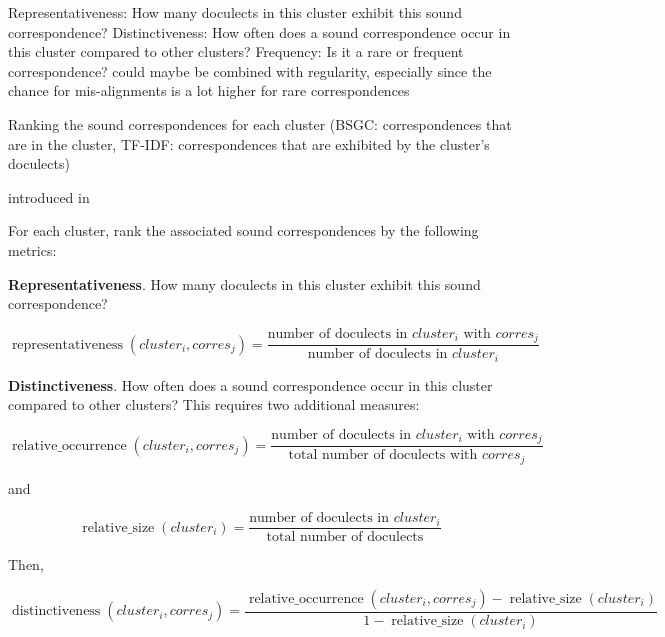 \documentclass[a4paper]{article}
\begin{document}
Representativeness: How many doculects in this cluster exhibit this sound correspondence? \citep{wieling2011bipartite}
Distinctiveness: How often does a sound correspondence occur in this cluster compared to other clusters? \citep{wieling2011bipartite}
Frequency: Is it a rare or frequent correspondence? could maybe be combined with regularity, especially since the chance for mis-alignments is a lot higher for rare correspondences

Ranking the sound correspondences for each cluster
(BSGC: correspondences that are in the cluster,
TF-IDF: correspondences that are exhibited by the cluster's doculects)

introduced in \citet{wieling2011bipartite}

For each cluster, rank the associated sound correspondences by the following metrics:

\textbf{Representativeness}.
How many doculects in this cluster exhibit this sound correspondence?

\begin{equation*}
\operatorname{representativeness}(cluster_i, corres_j) = 
\frac{\text{number of doculects in } cluster_i \text{ with }  corres_j}
{\text{number of doculects in }  cluster_i}
\end{equation*}

\textbf{Distinctiveness}.
How often does a sound correspondence occur in this cluster compared to other clusters? 
This requires two additional measures: 

\begin{equation*}
\operatorname{relative\_occurrence}(cluster_i, corres_j) = 
\frac{\text{number of doculects in } cluster_i \text{ with }  corres_j}
{\text{total number of doculects with } corres_j}
\end{equation*}

and

\begin{equation*}
\operatorname{relative\_size}(cluster_i) = 
\frac{\text{number of doculects in } cluster_i}
{\text{total number of doculects}}
\end{equation*}

Then, 

\begin{equation*}
\operatorname{distinctiveness}(cluster_i, corres_j) = 
\frac{\operatorname{relative\_occurrence}(cluster_i, corres_j) - \operatorname{relative\_size}(cluster_i)}
{1 - \operatorname{relative\_size}(cluster_i)}
\end{equation*}
\end{document}
